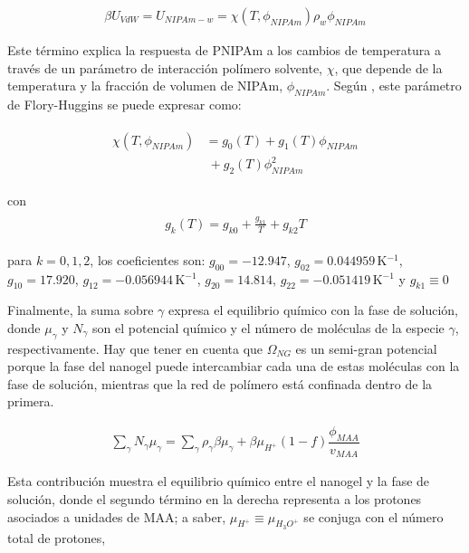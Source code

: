 	\begin{align}
		\beta U_{VdW} = U_{NIPAm-w} = \chi (T, \phi_{NIPAm})\rho_w \phi_{NIPAm}
	\end{align}
	
	
	Este  t\'ermino explica la respuesta de PNIPAm a los cambios de temperatura a trav\'es de un par\'ametro de interacci\'on pol\'imero solvente, $\chi$, que depende de la temperatura y la fracci\'on de volumen de NIPAm, $\phi_{NIPAm}$.
	Seg\'un  \citet{afroze2000}, este par\'ametro de Flory-Huggins se puede expresar como:
	
	
	\begin{align}
		\begin{aligned}
			\chi (T, \phi_{NIPAm}) &=g_0(T) +g_1(T)\phi_{NIPAm} \\
			&~+ g_2(T)\phi_{NIPAm}^2
		\end{aligned}
	\end{align}
	
	\noindent con
	\begin{align}
		\begin{aligned} 
			g_k(T)=g_{k0} + \frac{g_{k1}}{T} + g_{k2}T
		\end{aligned}
	\end{align}
	
	
	\noindent para  $k=0,1,2$, los coeficientes son: $g_{00}= -12.947$, $g_{02}=0.044959\,$K$^{-1}$, $g_{10}= 17.920$, $g_{12}= -0.056944$\,K$^{-1}$, $g_{20}= 14.814$, $g_{22}= -0.051419$\,K$^{-1}$  y $g_{k1}\equiv 0$ \cite{afroze2000}
	
	
	
	
	Finalmente, la suma sobre  $\gamma$ expresa el equilibrio qu\'imico con la fase de soluci\'on, donde $\mu_\gamma$ y $N_\gamma$ son el potencial qu\'imico y el n\'umero de mol\'eculas de la especie $\gamma$, respectivamente.
	Hay que tener en cuenta que $\Omega_{NG}$ es un semi-gran potencial porque la fase del nanogel puede intercambiar cada una de estas mol\'eculas con la fase de soluci\'on, mientras que la red de pol\'imero est\'a confinada dentro de la primera.
	
	
	\begin{align}
		\sum_\gamma N_\gamma \mu_\gamma = \sum_{\gamma }{\rho_\gamma\beta\mu_\gamma}
		+ \beta\mu_{H^+}(1-f)\dfrac{\phi_{MAA}}{v_{MAA}}
	\end{align}
	
	Esta contribuci\'on muestra el equilibrio qu\'imico entre el nanogel y la fase de soluci\'on, donde el segundo t\'ermino en la derecha representa a los protones asociados a unidades de MAA;
	a saber, $\mu_{H^+}\equiv\mu_{H_3O^+}$ se conjuga con el n\'umero total de protones,
	
